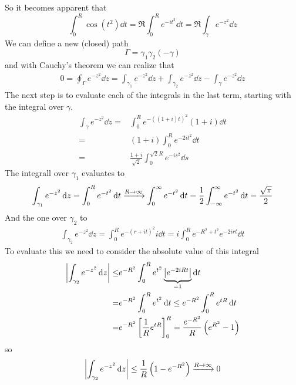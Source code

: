\documentclass[../../script.tex]{subfiles}
\begin{document}
\begin{eg}
\begin{center}
    \end{center}
    So it becomes apparent that 
    \[
        \int_0^R \cos(t^2) \dd{t} = \Re \int_0^R e^{-it^2} \dd{t} = \Re \int_{\gamma} e^{-z^2} \dd{z}
    \]
    We can define a new (closed) path 
    \[
        \Gamma = \gamma_1 \gamma_2 (-\gamma)
    \]
    and with Cauchy's theorem we can realize that 
    \begin{align*}
        0 = \oint_{\Gamma} e^{-z^2} \dd{z} = \int_{\gamma_1} e^{-z^2} \dd{z} + \int_{\gamma_2} e^{-z^2} \dd{z} - \int_{\gamma} e^{-z^2} \dd{z}
    \end{align*}
    The next step is to evaluate each of the integrals in the last term, starting with the integral over $\gamma$.
    \begin{align*}
        \int_{\gamma} e^{-z^2} \dd{z} = &\int_0^R e^{-((1+i)t)^2} (1+i) \dd{t} \\
        = &(1 + i) \int_0^R e^{-2it^2} \dd{t} \\
        = &\frac{1+i}{\sqrt{2}} \int_0^{\sqrt{2} R} e^{-is^2} \dd{s}
    \end{align*}
    The integrall over $\gamma_1$ evaluates to 
    \begin{align*}
        \int_{\gamma_1} e^{-z^2} \dd{z} = \int_0^R e^{-t^2} \dd{t} \conv{R \rightarrow \infty} \int_0^{\infty} e^{-t^2} \dd{t} = \frac{1}{2} \int_{-\infty}^{\infty} e^{-t^2} \dd{t} = \frac{\sqrt{\pi}}{2}
    \end{align*}
    And the one over $\gamma_2$ to 
    \begin{align*}
        \int_{\gamma_2} e^{-z^2} \dd{z} = \int_0^R e^{-(r +it)^2} i \dd{t} = i \int_0^R e^{-R^2 + t^2} e^{-2irt} \dd{t}
    \end{align*}
    To evaluate this we need to consider the absolute value of this integral 
    \begin{align*}
        \abs{\int_{\gamma_2} e^{-z^2} \dd{z}} \le &e^{-R^2} \int_0^R e^{t^2} \underbrace{\abs{e^{-2iRt}}}_{=1} \dd{t} \\
        = &e^{-R^2} \int_0^R e^{t^2} \dd{t} \le e^{-R^2} \int_0^R e^{tR} \dd{t} \\
        = &e^{-R^2} \left[\frac{1}{R} e^{tR}\right]_0^R = \frac{e^{-R^2}}{R} \left(e^{R^2} - 1\right)
    \end{align*}
    so 
    \[
        \abs{\int_{\gamma_2} e^{-z^2} \dd{z}} \le \frac{1}{R} \left(1 - e^{-R^2}\right) \conv{R \rightarrow \infty} 0 
\]
\end{eg}
\end{document}

